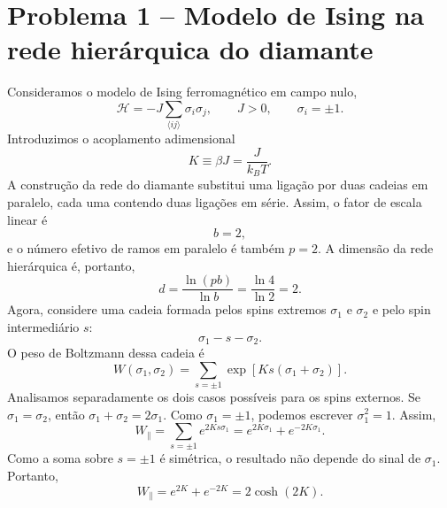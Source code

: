 \documentclass[12pt,a4paper]{article}
\begin{document}
\section*{Problema 1 -- Modelo de Ising na rede hierárquica do diamante}
%
Consideramos o modelo de Ising ferromagnético em campo nulo,
%
\begin{equation}
    \mathcal H
    =
    -J\sum_{\langle ij\rangle}\sigma_i\sigma_j,
    \qquad
    J>0,
    \qquad
    \sigma_i=\pm1.
    \label{eq:H_ising_p1}
\end{equation}
%
Introduzimos o acoplamento adimensional
%
\begin{equation}
    K\equiv\beta J=\frac{J}{k_BT}.
    \label{eq:K_p1}
\end{equation}
%
A construção da rede do diamante substitui uma ligação por duas cadeias em paralelo, cada uma contendo duas ligações em série. Assim, o fator de escala linear é
%
\begin{equation}
    b=2,
\end{equation}
%
e o número efetivo de ramos em paralelo é também \(p=2\). A dimensão da
rede hierárquica é, portanto,
%
\begin{equation}
    d
    =
    \frac{\ln(pb)}{\ln b}
    =
    \frac{\ln 4}{\ln 2}
    =
    2.
    \label{eq:dim_diamond}
\end{equation}
Agora, considere uma cadeia formada pelos spins extremos \(\sigma_1\) e
\(\sigma_2\) e pelo spin intermediário \(s\):
%
\begin{equation}
    \sigma_1-s-\sigma_2.
\end{equation}
%
O peso de Boltzmann dessa cadeia é
%
\begin{equation}
    W(\sigma_1,\sigma_2)
    =
    \sum_{s=\pm1}
    \exp\left[
        K s(\sigma_1+\sigma_2)
    \right].
    \label{eq:W_chain_p1}
\end{equation}
%
Analisamos separadamente os dois casos possíveis para os spins externos. Se \(\sigma_1=\sigma_2\), então \(\sigma_1+\sigma_2=2\sigma_1\). Como
\(\sigma_1=\pm1\), podemos escrever \(\sigma_1^2=1\). Assim,
%
\begin{equation}
    W_{\parallel}
    =
    \sum_{s=\pm1}
    e^{2K s\sigma_1}
    =
    e^{2K\sigma_1}+e^{-2K\sigma_1}.
\end{equation}
%
Como a soma sobre \(s=\pm1\) é simétrica, o resultado não depende do
sinal de \(\sigma_1\). Portanto,
%
\begin{equation}
    W_{\parallel}
    =
    e^{2K}+e^{-2K}
    =
    2\cosh(2K).
    \label{eq:Wpar_p1}
\end{equation}
\end{document}
